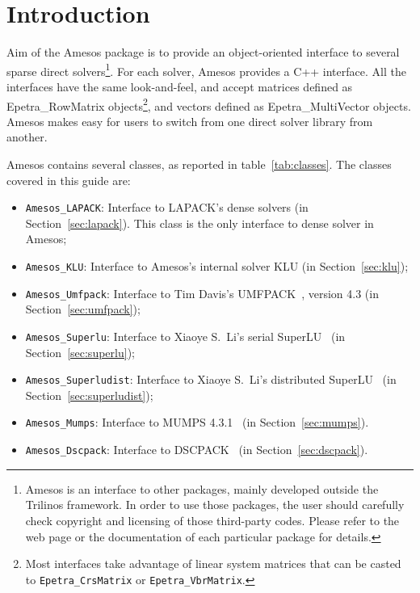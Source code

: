 \documentclass[11pt]{SANDreport}
\newcommand{\amesos}{{\sc Amesos}}
\begin{document}
\section{Introduction}
\label{sec:intro}

Aim of the Amesos package is to provide an object-oriented interface to
several sparse direct solvers\footnote{Amesos is an interface to other
  packages, mainly developed outside the Trilinos framework. In order to
  use those packages, the user should carefully check copyright and
  licensing of those third-party codes.  Please refer to the web page or
  the documentation of each particular package for details.}. For each
solver, Amesos provides a C++ interface. All the interfaces have the
same look-and-feel, and accept matrices defined as Epetra\_RowMatrix
objects\footnote{Most interfaces take advantage of linear system matrices 
  that can be casted to {\tt Epetra\_CrsMatrix} or {\tt Epetra\_VbrMatrix}.}, 
  and vectors defined as Epetra\_MultiVector objects. Amesos
makes easy for users to switch from one direct solver library from
another.

Amesos contains several classes, as reported in table~\ref{tab:classes}.
The classes covered in this guide are:
\begin{itemize}
\item \verb!Amesos_LAPACK!: Interface to LAPACK's dense solvers (in
  Section~\ref{sec:lapack}). This class is the only interface to
  dense solver in \amesos;
\item \verb!Amesos_KLU!: Interface to Amesos's internal solver KLU (in
  Section~\ref{sec:klu});
\item \verb!Amesos_Umfpack!: Interface to Tim Davis's
  UMFPACK~\cite{umfpack-home-page}, version 4.3 (in Section~\ref{sec:umfpack});
\item \verb!Amesos_Superlu!: Interface to Xiaoye S.~Li's serial
  SuperLU~\cite{superlu-home-page} (in Section~\ref{sec:superlu});
\item \verb!Amesos_Superludist!: Interface to Xiaoye S.~Li's distributed
  SuperLU~\cite{superlu-home-page} (in Section~\ref{sec:superludist});
\item \verb!Amesos_Mumps!: Interface to MUMPS
  4.3.1~\cite{mumps-home-page} (in Section~\ref{sec:mumps}).
\item \verb!Amesos_Dscpack!: Interface to DSCPACK~\cite{dscpack-manual} 
(in Section~\ref{sec:dscpack}).
\end{itemize}
\end{document}
